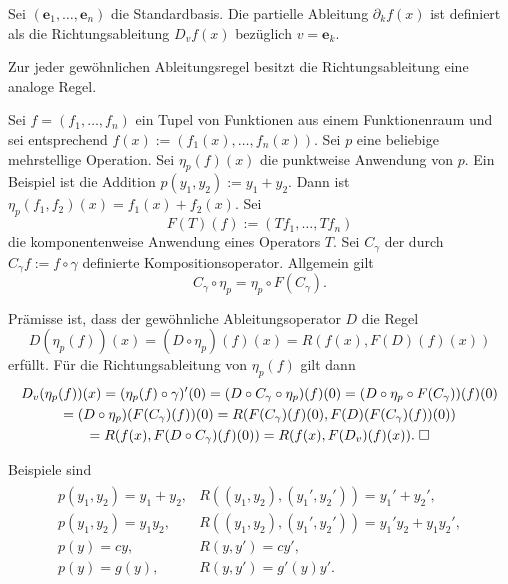 \begin{Definition}\newlinefirst
Sei $(\mathbf e_1,\ldots,\mathbf e_n)$ die Standardbasis. 
Die partielle Ableitung $\partial_k f(x)$ ist definiert als
die Richtungsableitung $D_v f(x)$ bezüglich $v=\mathbf e_k$.
\end{Definition}

\begin{Korollar}
Zur jeder gewöhnlichen Ableitungsregel besitzt die
Richtungsableitung eine analoge Regel.
\end{Korollar}
Sei $f=(f_1,\ldots,f_n)$ ein Tupel von Funktionen aus einem
Funktionenraum und sei entsprechend
$f(x):=(f_1(x),\ldots, f_n(x))$. Sei $p$ eine beliebige mehrstellige
Operation. Sei $\eta_p(f)(x)$ die punktweise Anwendung von $p$.
Ein Beispiel ist die Addition $p(y_1,y_2):=y_1+y_2$. Dann ist
$\eta_p(f_1,f_2)(x)=f_1(x)+f_2(x)$. Sei%
\[F(T)(f) := (T f_1,\ldots ,T f_n)\]
die komponentenweise Anwendung eines Operators $T$.
Sei $C_\gamma$ der durch $C_\gamma f := f\circ\gamma$ definierte
Kompositionsoperator. Allgemein gilt%
\[C_\gamma\circ\eta_p = \eta_p\circ F(C_\gamma).\]

\begin{Beweis}
Prämisse ist, dass der gewöhnliche Ableitungsoperator $D$ die Regel
\[D(\eta_p(f))(x) = (D\circ\eta_p)(f)(x) = R(f(x),F(D)(f)(x))\]
erfüllt. Für die Richtungsableitung von $\eta_p(f)$ gilt dann
\begin{gather*}
D_v(\eta_p(f))(x) = (\eta_p(f)\circ\gamma)'(0)
= (D\circ C_\gamma\circ\eta_p)(f)(0)
= (D\circ\eta_p\circ F(C_\gamma))(f)(0)\\
= (D\circ\eta_p)(F(C_\gamma)(f))(0)
= R(F(C_\gamma)(f)(0),F(D)(F(C_\gamma)(f))(0))\\
= R(f(x),F(D\circ C_\gamma)(f)(0))
= R(f(x),F(D_v)(f)(x)).\;\square
\end{gather*}
\end{Beweis}

\noindent
Beispiele sind
\begin{gather*}
\begin{array}{ll}
p(y_1,y_2) = y_1+y_2, & R((y_1,y_2),(y_1',y_2')) = y_1'+y_2',\\[4pt]
p(y_1,y_2) = y_1 y_2, & R((y_1,y_2),(y_1',y_2')) = y_1'y_2 + y_1y_2',\\[4pt]
p(y) = cy, & R(y,y') = cy',\\[4pt]
p(y) = g(y), & R(y,y') = g'(y)y'.
\end{array}
\end{gather*}


